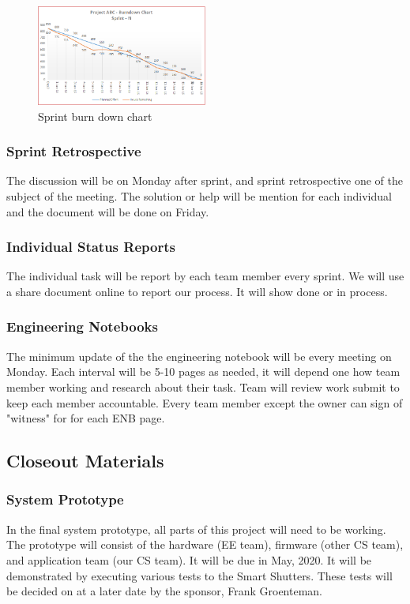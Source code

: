 \begin{figure}[h!]
    \centering
    \includegraphics[width=0.5\textwidth]{images/burn_down_chart}
    \caption{Sprint burn down chart}
\end{figure}

\subsubsection{Sprint Retrospective}

The discussion will be on Monday after sprint, and sprint retrospective one of the subject of the meeting. The solution or help will be mention for each individual and the document will be done on Friday.


\subsubsection{Individual Status Reports}

The individual task will be report by each team member every sprint. We will use a share document online to report our process. It will show done or in process.
\subsubsection{Engineering Notebooks}
 
The minimum update of the the engineering notebook will be every meeting on Monday. Each interval will be 5-10 pages as needed, it will depend one how team member working and research about their task. Team will review work submit to keep each member accountable. Every team member except the owner can sign of "witness" for for each ENB page. 
\subsection{Closeout Materials}


\subsubsection{System Prototype}
In the final system prototype, all parts of this project will need to be working. The prototype will consist of the hardware (EE team), firmware (other CS team), and application team (our CS team). It will be due in May, 2020. It will be demonstrated by executing various tests to the Smart Shutters. These tests will be decided on at a later date by the sponsor, Frank Groenteman.


